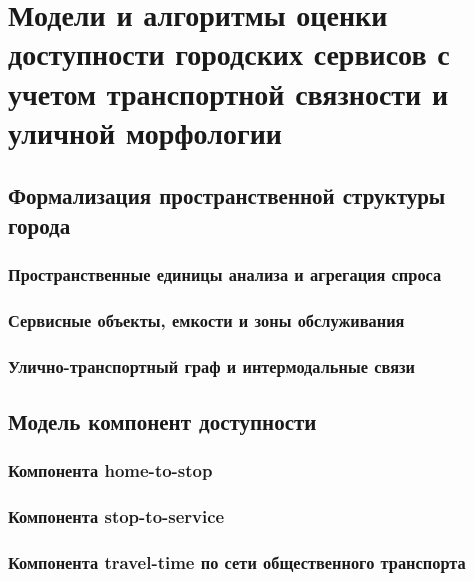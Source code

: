 \chapter{Модели и алгоритмы оценки доступности городских сервисов с учетом транспортной связности и уличной морфологии}
\label{ch:models-algorithms}

\section{Формализация пространственной структуры города}
\label{sec:city-structure-formalization}

\subsection{Пространственные единицы анализа и агрегация спроса}
\label{subsec:spatial-units-demand}

\subsection{Сервисные объекты, емкости и зоны обслуживания}
\label{subsec:service-capacity-zones}

\subsection{Улично-транспортный граф и интермодальные связи}
\label{subsec:street-pt-graph}

\section{Модель компонент доступности}
\label{sec:accessibility-components-model}

\subsection{Компонента home-to-stop}
\label{subsec:home-to-stop}

\subsection{Компонента stop-to-service}
\label{subsec:stop-to-service}

\subsection{Компонента travel-time по сети общественного транспорта}
\label{subsec:pt-travel-time}

